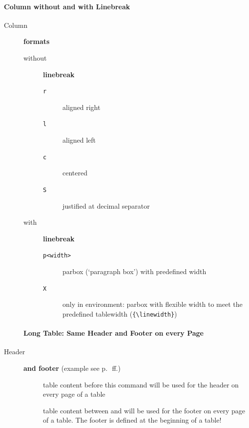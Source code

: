 \paragraph{Column without and with Linebreak}
\begin{description}
   \item[Column] \textbf{formats}
   \begin{description}
      \item[without] \textbf{linebreak}
      \begin{description}
         \item[\texttt{r}] aligned right
         \item[\texttt{l}] aligned left
         \item[\texttt{c}] centered
         \item[\texttt{S}] justified at decimal separator
      \end{description}
      \item[with] \textbf{linebreak}
      \begin{description}
         \item[\texttt{p{<width>}}] parbox (`paragraph box') with predefined width
         \item[\texttt{X}] only in  environment: parbox with flexible width to meet
         the predefined tablewidth (\eg \verb|{\linewidth}|)
      \end{description}
   \end{description}

   \paragraph{Long Table: Same Header and Footer on every Page}
   \item[Header] \textbf{and footer} (example see p.~\pageref{subsubsec:longtables}\,ff.)
   \begin{description}
      \item[] table content before this command
      will
      be used for the header on every page of a table
      \item[] table content between
       and  will be used for the footer on
      every page of a table. The footer is defined at the beginning of a table!
   \end{description}


\end{description}
